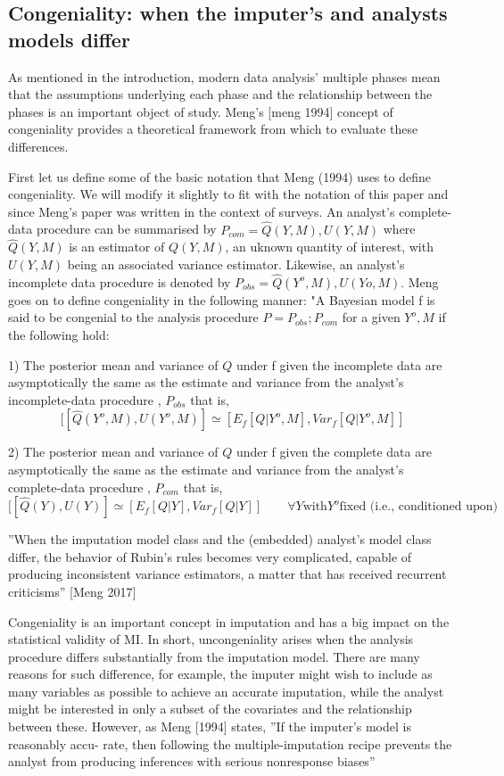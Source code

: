 \documentclass{article}
\begin{document}
	
	\subsection{Congeniality: when the imputer's and analysts models differ}
	As mentioned in the introduction, modern data analysis' multiple phases mean that the assumptions underlying each phase and the relationship between the phases is an important object of study. Meng's [meng 1994] concept of congeniality provides a theoretical framework from which to evaluate these differences.
	
	First let us define some of the basic notation that Meng (1994) uses to define congeniality. We will modify it slightly to fit with the notation of this paper and since Meng's paper was written in the context of surveys. An analyst's complete-data procedure can be summarised by $P_{com} = {\hat{Q}(Y, M), U(Y, M)}$ where $\hat{Q}(Y, M)$ is an estimator of $Q(Y, M)$, an uknown quantity of interest, with $U(Y, M)$ being an associated variance estimator. Likewise, an analyst's incomplete data procedure is denoted by $P_{obs} = {\hat{Q}(Y^{o}, M), U(Y{o}, M)}$. Meng goes on to define congeniality in the following manner: "A Bayesian model f is said to be congenial to the analysis procedure $P = {P_{obs};P_{com}}$ for a given ${Y^{o}, M}$ if the following hold:
	
	1) The posterior mean and variance of $Q$ under
	f given the incomplete data are asymptotically the
	same as the estimate and variance from the analyst's
	incomplete-data procedure , $P_{obs}$ that is, $$[[\hat{Q}(Y^{o}, M), U(Y^{o}, M)]\simeq [E_{f}[Q|{Y^{o}, M}], Var_{f}[Q|{Y^{o}, M}]]$$
	
	2)  The posterior mean and variance of $Q$ under
	f given the complete data are asymptotically the
	same as the estimate and variance from the analyst's
	complete-data procedure , $P_{com}$ that is, $$[[\hat{Q}(Y), U(Y)]\simeq [E_{f}[Q|{Y}], Var_{f}[Q|{Y}]]\qquad \forall Y\textrm{with}Y^{o}\textrm{fixed (i.e., conditioned upon)}$$
	
	
	''When the imputation model class and the (embedded) analyst’s model class
	differ, the behavior of Rubin’s rules becomes very complicated, capable of producing inconsistent variance estimators, a matter that has received recurrent
	criticisms'' [Meng 2017]
	
	Congeniality is an important concept in imputation and has a big impact on the statistical validity of MI. In short, uncongeniality arises when the analysis procedure differs substantially from the imputation model. There are many reasons for such difference, for example, the imputer might wish to include as many variables as possible to achieve an accurate imputation, while the analyst might be interested in only a subset of the covariates and the relationship between these. However, as Meng [1994] states, ''If the imputer's model is reasonably accu-
	rate, then following the multiple-imputation recipe
	prevents the analyst from producing inferences with
	serious nonresponse biases''
	
\end{document}
